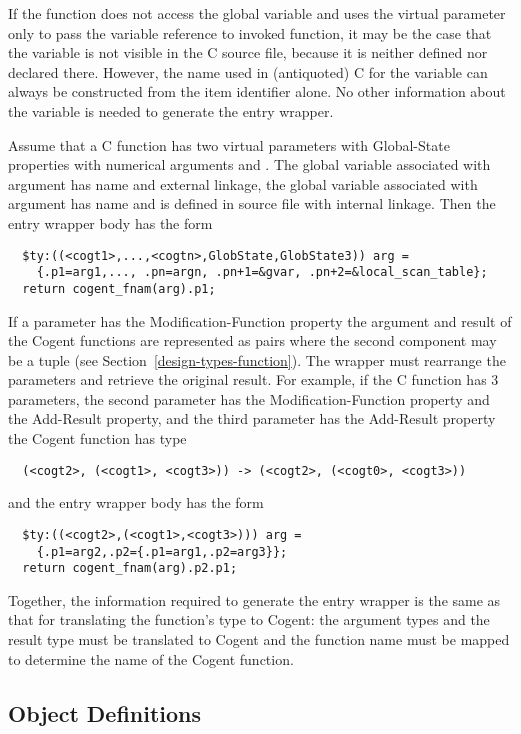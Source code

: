 If the function does not access the global variable and uses the virtual parameter only to pass the variable 
reference to invoked function, it may be the case that the variable is not visible in the C source file, because
it is neither defined nor declared there. However, the name used in (antiquoted) C for the variable can always 
be constructed from the item identifier alone. No other information about the variable is needed to generate the 
entry wrapper.

Assume that a C function has two virtual parameters with Global-State properties with numerical arguments 
 and . The global variable associated with argument  has name  and external linkage,
the global variable associated with argument  has name  and is defined in source file 
with internal linkage. Then the entry wrapper body has the form
\begin{verbatim}
  $ty:((<cogt1>,...,<cogtn>,GlobState,GlobState3)) arg = 
    {.p1=arg1,..., .pn=argn, .pn+1=&gvar, .pn+2=&local_scan_table};
  return cogent_fnam(arg).p1;
\end{verbatim}


If a parameter has the Modification-Function property the argument and result of the Cogent functions are
represented as pairs where the second component may be a tuple (see Section~\ref{design-types-function}). 
The wrapper must rearrange the parameters and retrieve the original result. For example, if the C 
function has 3 parameters, the second parameter has the Modification-Function property and the Add-Result 
property, and the third parameter has the Add-Result property the Cogent function has type
\begin{verbatim}
  (<cogt2>, (<cogt1>, <cogt3>)) -> (<cogt2>, (<cogt0>, <cogt3>))
\end{verbatim}
and the entry wrapper body has the form
\begin{verbatim}
  $ty:((<cogt2>,(<cogt1>,<cogt3>))) arg = 
    {.p1=arg2,.p2={.p1=arg1,.p2=arg3}};
  return cogent_fnam(arg).p2.p1;
\end{verbatim}

Together, the information required to generate the entry wrapper is the same as that for translating the 
function's type to Cogent: the argument types and the result type must be translated to Cogent and the
function name must be mapped to determine the name of the Cogent function.

\subsection{Object Definitions}
\label{design-fundefs-object}

